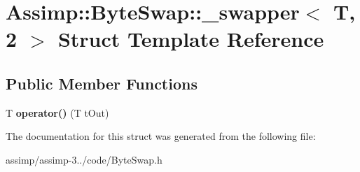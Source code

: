 \hypertarget{struct_assimp_1_1_byte_swap_1_1__swapper_3_01_t_00_012_01_4}{\section{Assimp\+:\+:Byte\+Swap\+:\+:\+\_\+swapper$<$ T, 2 $>$ Struct Template Reference}
\label{struct_assimp_1_1_byte_swap_1_1__swapper_3_01_t_00_012_01_4}
}
\subsection*{Public Member Functions}
\begin{DoxyCompactItemize}
\item 
\hypertarget{struct_assimp_1_1_byte_swap_1_1__swapper_3_01_t_00_012_01_4_a5af2a409a0d5903f8dd3d03ff9dfdc83}{T {\bfseries operator()} (T t\+Out)}\label{struct_assimp_1_1_byte_swap_1_1__swapper_3_01_t_00_012_01_4_a5af2a409a0d5903f8dd3d03ff9dfdc83}

\end{DoxyCompactItemize}


The documentation for this struct was generated from the following file\+:\begin{DoxyCompactItemize}
\item 
assimp/assimp-\/3../code/Byte\+Swap.\+h\end{DoxyCompactItemize}
